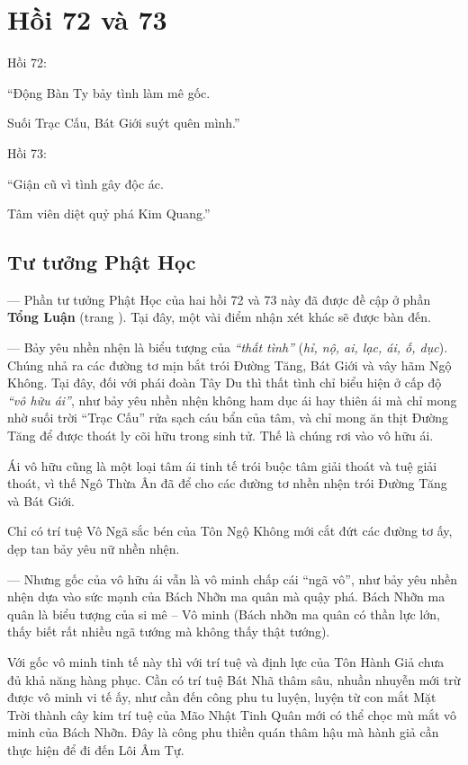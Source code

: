\chapter{Hồi 72 và 73} %
\label{cha:hoi_72_73}

Hồi 72:

\begin{itshape}
``Động Bàn Ty bảy tình làm mê gốc.

Suối Trạc Cấu, Bát Giới suýt quên mình.''
\end{itshape}

Hồi 73:

\begin{itshape}
``Giận cũ vì tình gây độc ác.

Tâm viên diệt quỷ phá Kim Quang.''
\end{itshape}

\section{Tư tưởng Phật Học} %
\label{sec:72_73_phat_hoc}

--- Phần tư tưởng Phật Học của hai hồi 72 và 73 này đã được đề cập ở phần {\bf Tổng Luận} (trang \pageref{sec:bieu_tuong_hoi_54_64_va_72}). Tại đây, một vài điểm nhận xét khác sẽ được bàn đến.

--- Bảy yêu nhền nhện là biểu tượng của \emph{``thất tình''} (\emph{hỉ, nộ, ai, lạc, ái, ố, dục}). Chúng nhả ra các đường tơ mịn bắt trói Đường Tăng, Bát Giới và vây hãm Ngộ Không. Tại đây, đối với phái đoàn Tây Du thì thất tình chỉ biểu hiện ở cấp độ \emph{``vô hữu ái''}, như bảy yêu nhền nhện không ham dục ái hay thiên ái mà chỉ mong nhờ suối trời ``Trạc Cấu'' rửa sạch cáu bẩn của tâm, và chỉ mong ăn thịt Đường Tăng để được thoát ly cõi hữu trong sinh tử. Thế là chúng rơi vào vô hữu ái.

Ái vô hữu cũng là một loại tâm ái tinh tế trói buộc tâm giải thoát và tuệ giải thoát, vì thế Ngô Thừa Ân đã để cho các đường tơ nhền nhện trói Đường Tăng và Bát Giới.

Chỉ có trí tuệ Vô Ngã sắc bén của Tôn Ngộ Không mới cắt đứt các đường tơ ấy, dẹp tan bảy yêu nữ nhền nhện.

--- Nhưng gốc của vô hữu ái vẫn là vô minh chấp cái ``ngã vô'', như bảy yêu nhền nhện dựa vào sức mạnh của Bách Nhỡn ma quân mà quậy phá. Bách Nhỡn ma quân là biểu tượng của si mê -- Vô minh (Bách nhỡn ma quân có thần lực lớn, thấy biết rất nhiều ngã tướng mà không thấy thật tướng).

Với gốc vô minh tinh tế này thì với trí tuệ và định lực của Tôn Hành Giả chưa đủ khả năng hàng phục. Cần có trí tuệ Bát Nhã thâm sâu, nhuần nhuyễn mới trừ được vô minh vi tế ấy, như cần đến công phu tu luyện, luyện từ con mắt Mặt Trời thành cây kim trí tuệ của Mão Nhật Tinh Quân mới có thể chọc mù mắt vô minh của Bách Nhỡn. Đây là công phu thiền quán thâm hậu mà hành giả cần thực hiện để đi đến Lôi Âm Tự.

